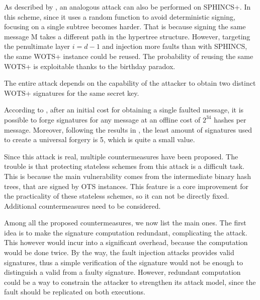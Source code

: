 \documentclass[a4paper,12pt]{article}
\begin{document}
As described by \cite{13_faultattacks}, an analogous attack can also be performed on SPHINCS+.
In this scheme, since it uses a random function to avoid deterministic signing, focusing on a single subtree becomes harder. That is because signing the same message M takes a different path in the hypertree structure. However, targeting the penultimate layer $i=d-1$ and injection more faults than with SPHINCS, the same WOTS+ instance could be reused. The probability of reusing the same WOTS+ is exploitable thanks to the birthday paradox.



The entire attack depends on the capability of the attacker to obtain two distinct WOTS+ signatures for the same secret key.

According to \cite{13_faultattacks}, after an initial cost for obtaining a single faulted message, it is possible to forge signatures for any message at an offline cost of $2^{34}$ hashes per message. 
Moreover, following the results in \cite{12_faultinjection}, the least amount of signatures used to create a universal forgery is 5, which is quite a small value.


Since this attack is real, multiple countermeasures have been proposed. The trouble is that protecting stateless schemes from this attack is a difficult task. This is because the main vulnerability comes from the intermediate binary hash trees, that are signed by OTS instances. This feature is a core improvement for the practicality of these stateless schemes, so it can not be directly fixed. Additional countermeasures need to be considered.

Among all the proposed countermeasures, we now list the main ones.
The first idea is to make the signature computation redundant, complicating the attack. This however would incur into a significant overhead, because the computation would be done twice. By the way, the fault injection attacks provides valid signatures, thus a simple verification of the signature would not be enough to distinguish a valid from a faulty signature. 
However, redundant computation could be a way to constrain the attacker to strengthen its attack model, since the fault should be replicated on both executions.
\end{document}

